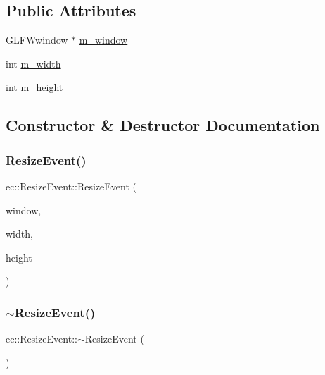 \subsection*{Public Attributes}
\begin{DoxyCompactItemize}
\item 
G\+L\+F\+Wwindow $\ast$ \mbox{\hyperlink{structec_1_1_resize_event_a9a68471a8acd0344eadf63c9d899316c}{m\+\_\+window}}
\item 
int \mbox{\hyperlink{structec_1_1_resize_event_a3bd717165bb68bb9d28de8c7fef55f32}{m\+\_\+width}}
\item 
int \mbox{\hyperlink{structec_1_1_resize_event_a5a69028703c6d2e1c4982850b5e66868}{m\+\_\+height}}
\end{DoxyCompactItemize}


\subsection{Constructor \& Destructor Documentation}
\mbox{\label{structec_1_1_resize_event_a9e2b74fa922300d28f80fb37ef8aab79}} 
\subsubsection{\texorpdfstring{Resize\+Event()}{ResizeEvent()}}
{\footnotesize\ttfamily ec\+::\+Resize\+Event\+::\+Resize\+Event (\begin{DoxyParamCaption}\item[{G\+L\+F\+Wwindow $\ast$}]{window,  }\item[{const int}]{width,  }\item[{const int}]{height }\end{DoxyParamCaption})}

\mbox{\label{structec_1_1_resize_event_af55ba5e409720c2cf03cdb97347e3898}} 
\subsubsection{\texorpdfstring{$\sim$\+Resize\+Event()}{~ResizeEvent()}}
{\footnotesize\ttfamily ec\+::\+Resize\+Event\+::$\sim$\+Resize\+Event (\begin{DoxyParamCaption}{ }\end{DoxyParamCaption})}



